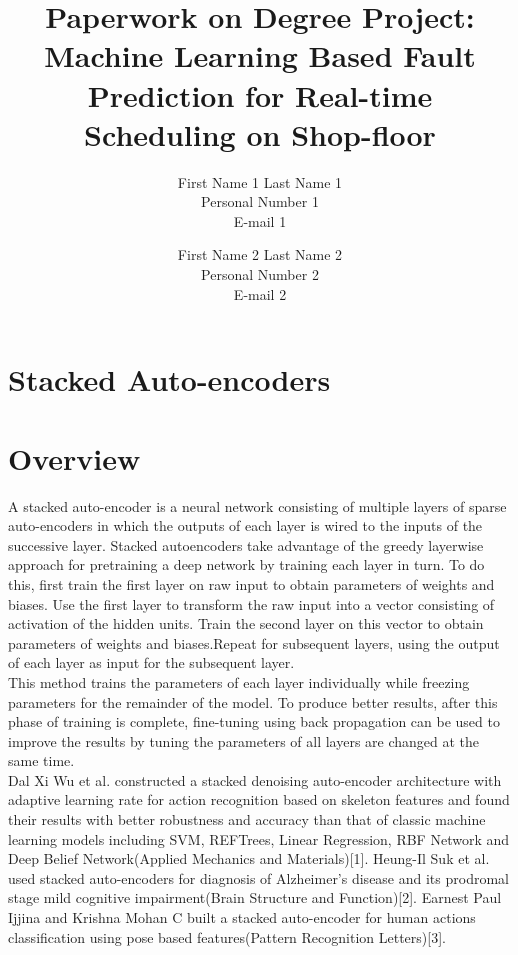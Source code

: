 \documentclass[a4paper,12pt,oneside,onecolumn]{article} %
\begin{document}

\title{Paperwork on Degree Project: Machine Learning Based Fault Prediction for Real-time Scheduling on Shop-floor}
\author{
  First Name 1 Last Name 1 \\ Personal Number 1 \\ E-mail 1 
  \and 
  First Name 2 Last Name 2 \\ Personal Number 2 \\ E-mail 2
  }

\maketitle                     %





\section*{Stacked Auto-encoders}

\section*{Overview}
A stacked auto-encoder is a neural network consisting of multiple layers of sparse auto-encoders in which the outputs of each layer is wired to the inputs of the successive layer. Stacked autoencoders take advantage of the greedy layerwise approach for pretraining a deep network by training each layer in turn. To do this, first train the first layer on raw input to obtain parameters of weights and biases. Use the first layer to transform the raw input into a vector consisting of activation of the hidden units. Train the second layer on this vector to obtain parameters of weights and biases.Repeat for subsequent layers, using the output of each layer as input for the subsequent layer.\\
This method trains the parameters of each layer individually while freezing parameters for the remainder of the model. To produce better results, after this phase of training is complete, fine-tuning using back propagation can be used to improve the results by tuning the parameters of all layers are changed at the same time.
\\
Dal Xi Wu et al. constructed  a stacked denoising auto-encoder architecture with adaptive learning rate for action recognition based on skeleton features and found their results with better robustness and accuracy than that of classic machine learning models including SVM, REFTrees, Linear Regression, RBF Network and Deep Belief Network(Applied Mechanics and Materials)[1]. Heung-Il Suk et al. used stacked auto-encoders for diagnosis of Alzheimer's disease and its prodromal stage mild cognitive impairment(Brain Structure and Function)[2]. Earnest Paul Ijjina and Krishna Mohan C built a stacked auto-encoder for human actions classification using pose based features(Pattern Recognition Letters)[3]. 
\end{document}
